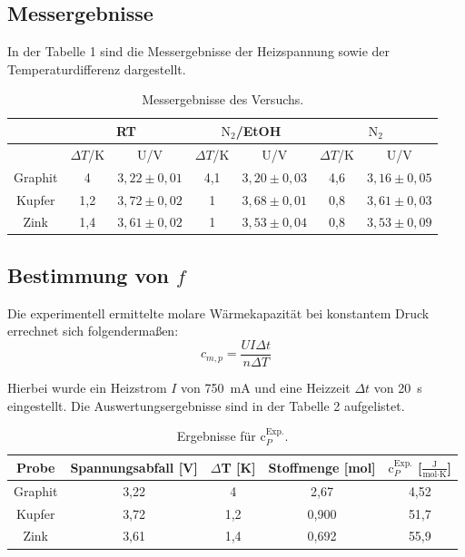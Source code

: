 \documentclass[12pt,a4paper,titlepage,headinclude,bibtotoc]{scrartcl}
\begin{document}
\subsection{Messergebnisse}
In der Tabelle 1 sind die Messergebnisse der Heizspannung sowie der Temperaturdifferenz dargestellt.
\begin{table}[h!]
\centering
\caption{Messergebnisse des Versuchs.}
\begin{tabular}{c|c|c|c|c|c|c}
&\multicolumn{2}{c}{RT}&\multicolumn{2}{|c}{$\text{N}_2$/EtOH}&\multicolumn{2}{|c}{$\text{N}_2$}\\
\hline
&$\Delta T$/\;K&  U/\;V&$\Delta T$/\;K&  U/\;V&$\Delta T$/\;K&  U/\;V\\
\hline
Graphit & 4 & $3,22\pm0,01$ & 4,1 &$3,20\pm0,03$&4,6&$3,16\pm0,05$\\  
Kupfer & 1,2 & $3,72\pm0,02$ & 1 &$3,68\pm 0,01$&0,8&$3,61\pm0,03$\\ 
Zink & 1,4 & $3,61\pm 0,02$ &1 &$3,53\pm0,04$&0,8&$3,53\pm 0,09$ \\ 
\end{tabular} 
\end{table}
\FloatBarrier
\subsection{Bestimmung von $f$}

Die experimentell ermittelte molare Wärmekapazität bei konstantem Druck errechnet sich folgendermaßen:\\

\begin{equation}
c_{m,p} = \frac{UI\Delta t}{n\Delta T}
\end{equation}

Hierbei wurde ein Heizstrom $I$ von 750~mA und eine Heizzeit $\Delta t$ von 20~s eingestellt. Die Auswertungsergebnisse sind in der Tabelle 2 aufgelistet.
\begin{table}[h!]
\centering
\caption{Ergebnisse für $\text{c}_P^{\text{Exp.}}$.}
\begin{tabular}{c|c|c|c|c}
Probe& Spannungsabfall [V] & $\Delta$T [K]& Stoffmenge [mol] &  $\text{c}_P^{\text{Exp.}}$ [$\frac{\text{J}}{\text{mol}\cdot\text{K}}$]\\
\hline
Graphit & 3,22&4 &2,67 &4,52 \\
\hline
Kupfer & 3,72 & 1,2&0,900&51,7  \\
\hline
Zink & 3,61& 1,4& 0,692 &55,9\\
\end{tabular}
\end{table}
\FloatBarrier 
\end{document}
